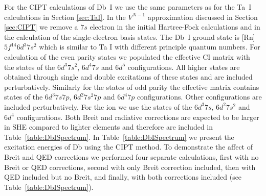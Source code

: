\documentclass[8pt,a4paper, twoside]{report}
\begin{document}
For the CIPT calculations of Db~I we use the same parameters as for the Ta~I calculations in Section \ref{sec:TaI}. In the $V^{N-1}$ approximation discussed in Section \ref{sec:CIPT} we remove a $7s$ electron in the initial Hartree-Fock
calculations and in the calculation of the single-electron basis states.
 The Db~I ground state is [Rn]$5f^{14}6d^3 7s^2$ which is similar to Ta I with different principle quantum numbers. For calculation of the even parity states we populated the effective CI matrix with the states of the $6d^3 7s^2$,  $6d^4 7s$ and $6d^5$ configurations. All higher states are obtained through single and double excitations of these states and are included perturbatively. Similarly for  the states of odd parity the effective matrix contains states of the  $6d^3 7s 7p$, $6d^2 7s^2 7p$ and $6d^4 7p$ configurations. Other configurations are included perturbatively. For the ion  we use the states of the $6d^3 7s$, $6d^2 7s^2$ and $6d^4$ configurations.  Both Breit and radiative corrections are expected to be larger in SHE compared to lighter elements and therefore are included in Table~\ref{table:DbISpectrum}. In Table~\ref{table:DbISpectrum} we present the excitation energies of Db using the CIPT method. To demonstrate the affect of  Breit and QED corrections we performed four separate calculations,
first with no Breit or QED corrections, second with only Breit correction included, then with QED included but no Breit, and finally,
with both corrections included (see Table~\ref{table:DbISpectrum}).
\end{document}
